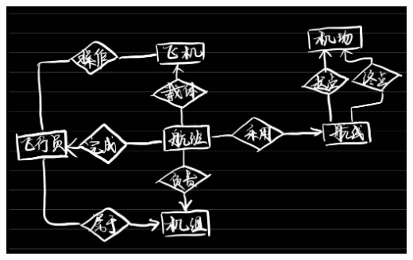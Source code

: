 \documentclass[UTF8]{ctexart}
\begin{document}
\subsection{}

\includegraphics[width=\textwidth]{./pics/6.jpeg}
\end{document}
